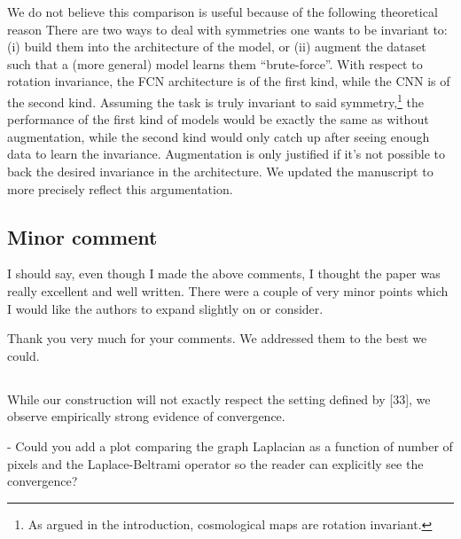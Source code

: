 \documentclass[12pt,a4paper]{article}
\newcommand{\nati}[1]{{\color[rgb]{.1,.6,.1}{NP: #1}}}
\newcommand{\mdeff}[1]{{\color[rgb]{.1,.6,.1}{MD: #1}}}
\newcommand{\TK}[1]{{\color{red}{TK: #1}}}
\newcommand{\1}{\b{1}}              %
\newcommand{\0}{\b{0}}              %
\begin{document}
We do not believe this comparison is useful because of the following theoretical reason
There are two ways to deal with symmetries one wants to be invariant to: (i) build them into the architecture of the model, or (ii) augment the dataset such that a (more general) model learns them ``brute-force''.
With respect to rotation invariance, the FCN architecture is of the first kind, while the CNN is of the second kind.
Assuming the task is truly invariant to said symmetry,\footnote{As argued in the introduction, cosmological maps are rotation invariant.} the performance of the first kind of models would be exactly the same as without augmentation, while the second kind would only catch up after seeing enough data to learn the invariance.
Augmentation is only justified if it's not possible to back the desired invariance in the architecture.
We updated the manuscript to more precisely reflect this argumentation.

\TK{Seems a bit strong to me.. maybe we would write it in a softer language?}
\nati{Now it is OK. But is it still strong enough. We should only point reviewer incoherence if necessary.}


\subsection*{Minor comment}

\begin{mdframed}[style=comment]
I should say, even though I made the above comments, I thought the paper was really excellent and well written. There were a couple of very minor points which I would like the authors to expand slightly on or consider.
\end{mdframed}

Thank you very much for your comments. We addressed them to the best we could.

\subsection{}
\begin{mdframed}[style=comment]
While our construction will not exactly respect the setting defined by [33], we observe empirically strong evidence of convergence.

- Could you add a plot comparing the graph Laplacian as a function of number of pixels and the Laplace-Beltrami operator so the reader can explicitly see the convergence?
\end{mdframed}
\end{document}
